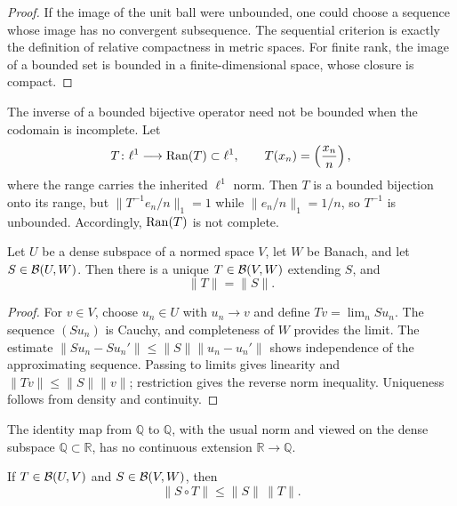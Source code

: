 \begin{proof}
If the image of the unit ball were unbounded, one could choose a sequence whose
image has no convergent subsequence.  The sequential criterion is exactly the
definition of relative compactness in metric spaces.  For finite rank, the
image of a bounded set is bounded in a finite-dimensional space, whose closure
is compact.
\end{proof}

\begin{noteexercise}
The inverse of a bounded bijective operator need not be bounded when the
codomain is incomplete.  Let
\[
  T\colon \ell^1\longrightarrow \operatorname{Ran}(T)\subset\ell^1,
  \qquad
  T(x_n)=\left(\frac{x_n}{n}\right),
\]
where the range carries the inherited $\ell^1$ norm.  Then $T$ is a bounded
bijection onto its range, but
$\|T^{-1}e_n/n\|_1=1$ while $\|e_n/n\|_1=1/n$, so $T^{-1}$ is
unbounded.  Accordingly, $\operatorname{Ran}(T)$ is not complete.
\end{noteexercise}

\begin{notetheorem}
Let $U$ be a dense subspace of a normed space $V$, let $W$ be Banach, and let
$S\in\mathcal{B}(U,W)$.  Then there is a unique
$T\in\mathcal{B}(V,W)$ extending $S$, and
\[
  \|T\|=\|S\|.
\]
\end{notetheorem}

\begin{proof}
For $v\in V$, choose $u_n\in U$ with $u_n\to v$ and define
$Tv=\lim_nSu_n$.  The sequence $(Su_n)$ is Cauchy, and completeness of $W$
provides the limit.  The estimate
$\|Su_n-Su_n'\|\le\|S\|\|u_n-u_n'\|$ shows independence of the
approximating sequence.  Passing to limits gives linearity and
$\|Tv\|\le\|S\|\|v\|$; restriction gives the reverse norm inequality.
Uniqueness follows from density and continuity.
\end{proof}

\begin{noteexample}
The identity map from $\mathbb Q$ to $\mathbb Q$, with the usual norm and
viewed on the dense subspace $\mathbb Q\subset\mathbb R$, has no continuous
extension $\mathbb R\to\mathbb Q$.
\end{noteexample}

\begin{notecorollary}
If $T\in\mathcal{B}(U,V)$ and $S\in\mathcal{B}(V,W)$, then
\[
  \|S\circ T\|\le\|S\|\,\|T\|.
\]
\end{notecorollary}

